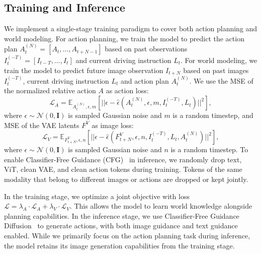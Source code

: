 \subsection{Training and Inference}
\label{sec: method_train}
 We implement a single-stage training paradigm to cover both action planning and world modeling. For action planning, we train the model to predict the action plan $A_t^{(N)}=[A_t, ..., A_{t+N-1}]$ based on past observations $I_t^{(-T)}=[I_{t-T}, ..., I_t]$ and current driving instruction $L_t$. For world modeling, we train the model to predict future image observation $I_{t+N}$ based on past images $I_t^{(-T)}$, current driving instruction $L_t$ and action plan $A_t^{(N)}$. We use the MSE of the normalized relative action $A$ as action loss:
 \begin{equation}
    \mathcal{L}_A = \mathbb{E}_{A_t^{(N)}, \epsilon, m}[ || \epsilon - \hat\epsilon(A_t^{(N)}, \epsilon, m, I_t^{(-T)}, L_t) ||^2 ], 
\end{equation}
where $\epsilon\sim\mathcal{N}(0, \mathbf{I})$ is sampled Gaussian noise and $m$ is a random timestep, and MSE of the VAE latents $F^V$ as image loss: 
 \begin{equation}
    \mathcal{L}_V = \mathbb{E}_{F_{t+N}^V, \epsilon, n}[ || \epsilon - \hat\epsilon(F_{t+N}^V, \epsilon, n, I_t^{(-T)}, L_t, A_t^{(N)}) ||^2 ], 
\end{equation}
where $\epsilon\sim\mathcal{N}(0, \mathbf{I})$ is sampled Gaussian noise and $n$ is a random timestep. 
To enable Classifier-Free Guidance (CFG)~\cite{cfg} in inference, we randomly drop text, ViT, clean VAE, and clean action tokens during training. Tokens of the same modality that belong to different images or actions are dropped or kept jointly. 



In the training stage, we optimize a joint objective with loss $\mathcal{L} = \lambda_A \cdot \mathcal{L}_A + \lambda_V \cdot \mathcal{L}_V$. This allows the model to learn world knowledge alongside planning capabilities. 
In the inference stage, we use Classifier-Free Guidance Diffusion~\cite{cfg} to generate actions, with both image guidance and text guidance enabled. 
While we primarily focus on the action planning task during inference, the model retains its image generation capabilities from the training stage. 
